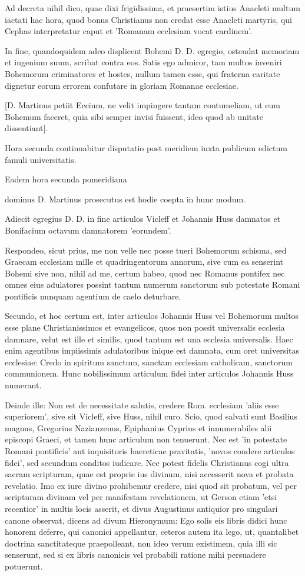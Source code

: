Ad decreta nihil dico, quae dixi frigidissima, et praesertim istius Anacleti multum iactati hac hora, quod bonus Christianus non credat esse Anacleti martyris, qui Cephas interpretatur caput et 'Romanam ecclesiam vocat cardinem'.

In fine, quandoquidem adeo displicent Bohemi D. D. egregio, ostendat memoriam et ingenium suum, scribat contra eos. Satis ego admiror, tam multos inveniri Bohemorum criminatores et hostes, nullum tamen esse, qui fraterna caritate dignetur eorum errorem confutare in gloriam Romanae ecclesiae.

[D. Martinus petiit Eccium, ne velit impingere tantam contumeliam, ut eum Bohemum faceret, quia sibi semper invisi fuissent, ideo quod ab unitate dissentiant].

\marginpar{\small[279]} Hora secunda continuabitur disputatio post meridiem iuxta publicum edictum famuli universitatis.

Eadem hora secunda pomeridiana

dominus D. Martinus prosecutus est hodie coepta in hunc modum.

Adiecit egregius D. D. in fine articulos Vicleff et Johannis Huss damnatos et Bonifacium octavum damnatorem 'eorundem'.

Respondeo, sicut prius, me non velle nec posse tueri Bohemorum schisma, sed Graecam ecclesiam mille et quadringentorum annorum, sive cum ea senserint Bohemi sive non, nihil ad me, certum habeo, quod nec Romanus pontifex nec omnes eius adulatores possint tantum numerum sanctorum sub potestate Romani pontificis nunquam agentium de caelo deturbare.

Secundo, et hoc certum est, inter articulos Johannis Huss vel Bohemorum multos esse plane Christianissimos et evangelicos, quos non possit universalis ecclesia damnare, velut est ille et similis, quod tantum est una ecclesia universalis. Haec enim agentibus impiissimis adulatoribus inique est damnata, cum oret universitas ecclesiae: Credo in spiritum sanctum, sanctam ecclesiam catholicam, sanctorum communionem. Hunc nobilissimum articulum fidei inter articulos Johannis Huss numerant.

Deinde ille: Non est de necessitate salutis, credere Rom. ecclesiam 'aliis esse superiorem', sive sit Vicleff, sive Huss, nihil curo. Scio, quod salvati sunt Basilius magnus, Gregorius Nazianzenus, Epiphanius Cyprius et innumerabiles alii episcopi Graeci, et tamen hunc articulum non tenuerunt. Nec est 'in potestate Romani pontificis' aut inquisitoris haereticae pravitatis, 'novos condere articulos fidei', sed secundum conditos iudicare. Nec potest fidelis Christianus cogi ultra sacram scripturam, quae est proprie ius divinum, nisi accesserit nova et probata revelatio. Imo ex iure divino prohibemur credere, nisi quod sit probatum, vel per scripturam divinam vel per manifestam revelationem, ut Gerson etiam 'etsi recentior' in multis locis asserit, et divus Augustinus antiquior pro singulari canone observat, dicens ad divum Hieronymum: Ego solis eis libris didici hunc honorem deferre, qui canonici appellantur, ceteros autem ita lego, ut, quantalibet doctrina sanctitateque praepolleant, non ideo verum existimem, quia illi sic senserunt, sed si ex libris canonicis vel probabili ratione mihi persuadere potuerunt.

